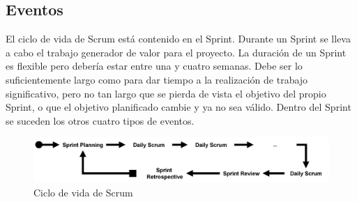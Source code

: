 \subsection{Eventos}

El ciclo de vida de Scrum está contenido en el Sprint. Durante un Sprint se lleva a cabo el trabajo generador de valor para el proyecto. La duración de un Sprint es flexible pero debería estar entre una y cuatro semanas. Debe ser lo suficientemente largo como para dar tiempo a la realización de trabajo significativo, pero no tan largo que se pierda de vista el objetivo del propio Sprint, o que el objetivo planificado cambie y ya no sea válido. Dentro del Sprint se suceden los otros cuatro tipos de eventos.

\begin{figure}[hp!]
    \centering
    \includegraphics[width=1.0\textwidth]{imaxes/d-metodologia/ciclo-scrum.png}
    \caption{Ciclo de vida de Scrum}
    \label{fig:ciclo-vida-scrum}
\end{figure}

